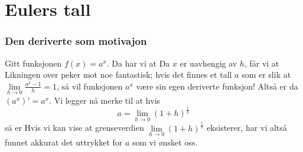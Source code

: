 



	
\section{Eulers tall} \label{eulerstallfork}
\subsubsection{Den deriverte som motivajon}
Gitt funksjonen $ f(x)=a^x $. Da har vi at
Da $ x $ er uavhengig av $ h $, får vi at
Likningen over peker mot noe fantastisk; hvis det finnes et tall $ a $ som er slik at $ {\lim\limits_{h\to 0}\frac{a^h-1}{h}=1} $, så vil funksjonen $ a^x $ være sin egen deriverte funksjon! Altså er da $ \left(a^x\right)'=a^x $. Vi legger nå merke til at hvis
\[ a=\lim\limits_{h\to 0}\left(1+h\right)^\frac{1}{h} \]
så er 
Hvis vi kan vise at grenseverdien $ \lim\limits_{h\to 0}\left(1+h\right)^\frac{1}{h} $ eksisterer, har vi altså funnet akkurat det uttrykket for $ a $ som vi ønsket oss.


